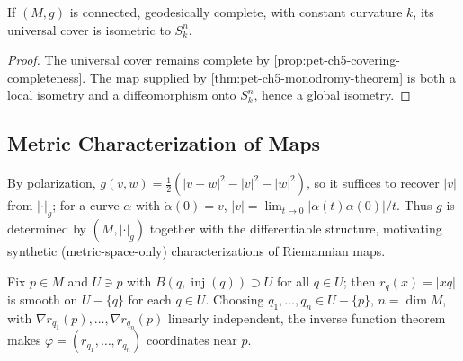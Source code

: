 \begin{corollary}
  \label{cor:pet-ch5-classification-constant-curvature}
  If $(M,g)$ is connected, geodesically complete, with constant curvature $k$, its
  universal cover is isometric to $S^n_k$.
\end{corollary}
\begin{proof}
  \sketch
  The universal cover remains complete by
  \cref{prop:pet-ch5-covering-completeness}.  The map supplied by
  \cref{thm:pet-ch5-monodromy-theorem} is both a local isometry and a
  diffeomorphism onto $S_k^n$, hence a global isometry.
\end{proof}

\subsection{Metric Characterization of Maps}

\begin{remark}
  \label{rem:pet-ch5-polarization-metric-recovery}
  By polarization, $g(v,w)=\tfrac12(|v+w|^2-|v|^2-|w|^2)$, so it suffices to
  recover $|v|$ from $|\cdot|_g$; for a curve $\alpha$ with $\dot\alpha(0)=v$,
  $|v|=\lim_{t\to0}|\alpha(t)\alpha(0)|/t$. Thus $g$ is determined by
  $(M,|\cdot|_g)$ together with the differentiable structure, motivating synthetic
  (metric-space-only) characterizations of Riemannian maps.
\end{remark}

\begin{definition}
  \label{def:pet-ch5-distance-coordinates}
  \leanok
  Fix $p\in M$ and $U\ni p$ with $B(q,\operatorname{inj}(q))\supset U$ for all
  $q\in U$; then $r_q(x)=|xq|$ is smooth on $U-\{q\}$ for each $q\in U$. Choosing
  $q_1,\dots,q_n\in U-\{p\}$, $n=\dim M$, with $\nabla r_{q_1}(p),\dots,\nabla
  r_{q_n}(p)$ linearly independent, the inverse function theorem makes
  $\varphi=(r_{q_1},\dots,r_{q_n})$ coordinates near $p$.
\end{definition}

